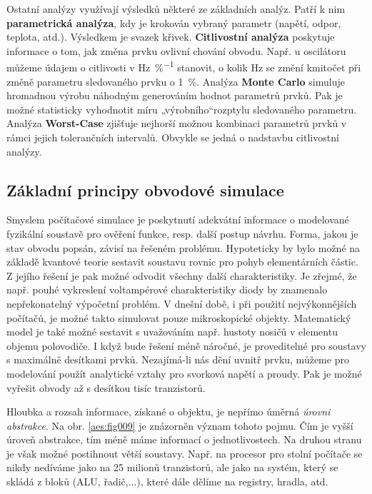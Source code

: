       Ostatní analýzy využívají výsledků některé ze základních analýz. Patří k nim
      \textbf{parametrická analýza}, kdy je krokován vybraný parametr (napětí, odpor, teplota,
      atd.). Výsledkem je svazek křivek. \textbf{Citlivostní analýza} poskytuje informace o tom, jak
      změna prvku ovlivní chování obvodu. Např. u oscilátoru můžeme údajem o citlivosti v
      \si{\Hz\per\percent} stanovit, o kolik \si{\Hz} se změní kmitočet při změně parametru
      sledovaného prvku o \SI{1}{\percent}. Analýza \textbf{Monte Carlo} simuluje hromadnou výrobu
      náhodným generováním hodnot parametrů prvků. Pak je možné statisticky vyhodnotit míru
      „výrobního“rozptylu sledovaného parametru. Analýza \textbf{Worst-Case} zjišťuje nejhorší
      možnou kombinaci parametrů prvků v rámci jejich tolerančních intervalů. Obvykle se jedná o
      nadstavbu citlivostní analýzy.

      \subsection{Základní principy obvodové simulace}
        Smyslem počítačové simulace je poskytnutí adekvátní informace o modelované fyzikální
        soustavě pro ověření funkce, resp. další postup návrhu. Forma, jakou je stav obvodu popsán,
        závisí na řešeném problému. Hypoteticky by bylo možné na základě kvantové teorie sestavit
        soustavu rovnic pro pohyb elementárních částic. Z jejího řešení je pak možné odvodit všechny
        další charakteristiky. Je zřejmé, že např. pouhé vykreslení voltampérové charakteristiky
        diody by znamenalo nepřekonatelný výpočetní problém. V dnešní době, i při použití
        nejvýkonnějších počítačů, je možné takto simulovat pouze mikroskopické objekty. Matematický
        model je také možné sestavit s uvažováním např. hustoty nosičů v elementu objemu polovodiče.
        I když bude řešení méně náročné, je proveditelné pro soustavy s maximálně desítkami prvků.
        Nezajímá-li nás dění uvnitř prvku, můžeme pro modelování použít analytické vztahy pro
        svorková napětí a proudy. Pak je možné vyřešit obvody až s desítkou tisíc tranzistorů.


        Hloubka a rozsah informace, získané o objektu, je nepřímo úměrná \emph{úrovni abstrakce}. Na
        obr. \ref{aes:fig009} je znázorněn význam tohoto pojmu. Čím je vyšší úroveň abstrakce, tím
        méně máme informací o jednotlivostech. Na druhou stranu je však možné postihnout větší
        soustavy. Např. na procesor pro stolní počítače se nikdy nedíváme jako na 25 milionů
        tranzistorů, ale jako na systém, který se skládá z bloků (ALU, řadič,...), které dále dělíme
        na registry, hradla, atd. 
        
